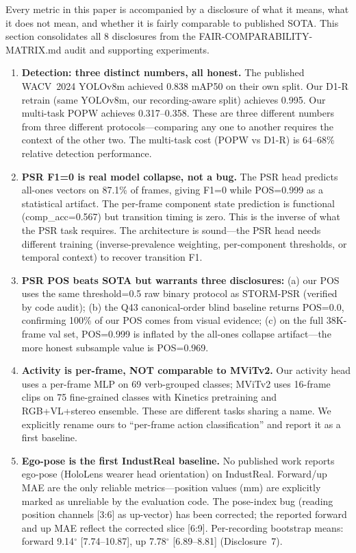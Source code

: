 \documentclass[conference]{IEEEtran}
\newcommand{\industreal}{IndustReal}
\begin{document}
Every metric in this paper is accompanied by a disclosure of what it means, what it does not mean, and whether it is fairly comparable to published SOTA. This section consolidates all 8 disclosures from the FAIR-COMPARABILITY-MATRIX.md audit and supporting experiments.

\begin{enumerate}
\item \textbf{Detection: three distinct numbers, all honest.} The published WACV~2024 YOLOv8m achieved 0.838 mAP50 on their own split. Our D1-R retrain (same YOLOv8m, our recording-aware split) achieves 0.995. Our multi-task POPW achieves 0.317--0.358. These are three different numbers from three different protocols---comparing any one to another requires the context of the other two. The multi-task cost (POPW vs D1-R) is 64--68\% relative detection performance.

\item \textbf{PSR F1=0 is real model collapse, not a bug.} The PSR head predicts all-ones vectors on 87.1\% of frames, giving F1=0 while POS=0.999 as a statistical artifact. The per-frame component state prediction is functional (comp\_acc=0.567) but transition timing is zero. This is the inverse of what the PSR task requires. The architecture is sound---the PSR head needs different training (inverse-prevalence weighting, per-component thresholds, or temporal context) to recover transition F1.

\item \textbf{PSR POS beats SOTA but warrants three disclosures:} (a) our POS uses the same threshold=0.5 raw binary protocol as STORM-PSR (verified by code audit); (b) the Q43 canonical-order blind baseline returns POS=0.0, confirming 100\% of our POS comes from visual evidence; (c) on the full 38K-frame val set, POS=0.999 is inflated by the all-ones collapse artifact---the more honest subsample value is POS=0.969.

\item \textbf{Activity is per-frame, NOT comparable to MViTv2.} Our activity head uses a per-frame MLP on 69 verb-grouped classes; MViTv2 uses 16-frame clips on 75 fine-grained classes with Kinetics pretraining and RGB+VL+stereo ensemble. These are different tasks sharing a name. We explicitly rename ours to ``per-frame action classification'' and report it as a first baseline.

\item \textbf{Ego-pose is the first \industreal{} baseline.} No published work reports ego-pose (HoloLens wearer head orientation) on \industreal. Forward/up MAE are the only reliable metrics---position values (mm) are explicitly marked as unreliable by the evaluation code. The pose-index bug (reading position channels [3:6] as up-vector) has been corrected; the reported forward and up MAE reflect the corrected slice [6:9]. Per-recording bootstrap means: forward 9.14$^\circ$ [7.74--10.87], up 7.78$^\circ$ [6.89--8.81] (Disclosure~7).


\end{enumerate}
\end{document}
